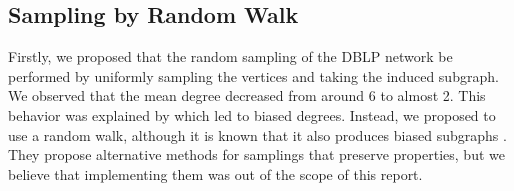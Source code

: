 

\subsection{Sampling by Random Walk \label{sec:sampling}}
Firstly, we proposed that the random sampling of the DBLP network be performed by uniformly sampling the vertices and taking the induced subgraph. We observed that the mean degree decreased from around 6 to almost 2. This behavior was explained by \cite{Stumpf2005} which led to biased degrees. Instead, we proposed to use a random walk, although it is known that it also produces biased subgraphs \cite{Gjoka2010,Maiya2011}. They propose alternative methods for samplings that preserve properties, but we believe that implementing them was out of the scope of this report.
